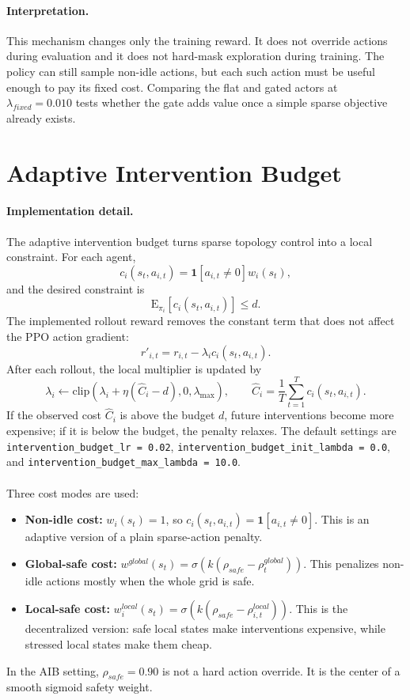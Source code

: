 \paragraph{Interpretation.}
This mechanism changes only the training reward. It does not override actions during
evaluation and it does not hard-mask exploration during training. The policy can
still sample non-idle actions, but each such action must be useful enough to pay
its fixed cost. Comparing the flat and gated actors at
$\lambda_{fixed}=0.010$ tests whether the gate adds value once a simple sparse
objective already exists.

\section{Adaptive Intervention Budget}
\label{subsec:sparse-control-aib}

\paragraph{Implementation detail.}
The adaptive intervention budget turns sparse topology control into a local
constraint. For each agent,
\[
  c_i(s_t,a_{i,t})=
  \mathbf{1}[a_{i,t}\neq0]w_i(s_t),
\]
and the desired constraint is
\[
  \mathrm{E}_{\pi_i}\left[c_i(s_t,a_{i,t})\right]\le d.
\]
The implemented rollout reward removes the constant term that does not affect
the PPO action gradient:
\[
  r'_{i,t}=r_{i,t}-\lambda_i c_i(s_t,a_{i,t}).
\]
After each rollout, the local multiplier is updated by
\[
  \lambda_i\leftarrow
  \mathrm{clip}\left(
    \lambda_i+\eta(\hat C_i-d),
    0,
    \lambda_{\max}
  \right),
  \qquad
  \hat C_i=\frac{1}{T}\sum_{t=1}^{T}c_i(s_t,a_{i,t}).
\]
If the observed cost \(\hat C_i\) is above the budget \(d\), future
interventions become more expensive; if it is below the budget, the penalty
relaxes. The default settings are \texttt{intervention\_budget\_lr = 0.02},
\texttt{intervention\_budget\_init\_lambda = 0.0}, and
\texttt{intervention\_budget\_max\_lambda = 10.0}.
\\
\\
Three cost modes are used:
\begin{itemize}
  \item \textbf{Non-idle cost:}
  \(w_i(s_t)=1\), so
  \(c_i(s_t,a_{i,t})=\mathbf{1}[a_{i,t}\neq0]\). This is an adaptive version
  of a plain sparse-action penalty.
  \item \textbf{Global-safe cost:}
  \(w^{global}(s_t)=\sigma(k(\rho_{safe}-\rho_t^{global}))\). This penalizes
  non-idle actions mostly when the whole grid is safe.
  \item \textbf{Local-safe cost:}
  \(w_i^{local}(s_t)=\sigma(k(\rho_{safe}-\rho_{i,t}^{local}))\). This is the
  decentralized version: safe local states make interventions expensive, while
  stressed local states make them cheap.
\end{itemize}
In the AIB setting, \(\rho_{safe}=0.90\) is not a hard action override. It is
the center of a smooth sigmoid safety weight.

